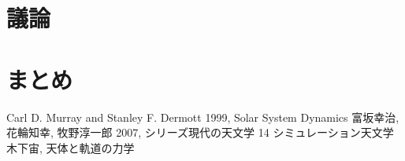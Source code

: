\documentclass[11pt,a4paper,oneside,onecolumn]{jreport}
\begin{document}
\section{議論}

\section{まとめ}

\begin{thebibliography}{9}
   Carl D. Murray and Stanley F. Dermott 1999, Solar System Dynamics
   富坂幸治, 花輪知幸, 牧野淳一郎 2007, シリーズ現代の天文学 14 シミュレーション天文学
   木下宙, 天体と軌道の力学
\end{thebibliography}
\end{document}
